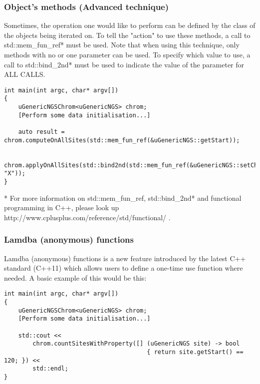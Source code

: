 \documentclass[letterpaper,10pt]{article}
\begin{document}
\subsubsection{Object's methods (Advanced technique)}
Sometimes, the operation one would like to perform can be defined by the class of the objects being iterated on. To tell the "action" to use these methods, a call to std::mem\_fun\_ref* must be used. Note that when using this technique, only methods with no or one parameter can be used. To specify which value to use, a call to std::bind\_2nd* must be used to indicate the value of the parameter for ALL CALLS.
\begin{verbatim}
int main(int argc, char* argv[])
{
    uGenericNGSChrom<uGenericNGS> chrom;
    [Perform some data initialisation...]

    auto result = chrom.computeOnAllSites(std::mem_fun_ref(&uGenericNGS::getStart));

    chrom.applyOnAllSites(std::bind2nd(std::mem_fun_ref(&uGenericNGS::setChr), "X"));
}
\end{verbatim}

* For more information on std::mem\_fun\_ref, std::bind\_2nd* and functional programming in C++, please look up http://www.cplusplus.com/reference/std/functional/ .

\subsubsection{Lamdba (anonymous) functions}
Lamdba (anonymous) functions is a new feature introduced by the latest C++ standard (C++11) which allows users to define a one-time use function where needed. A basic example of this would be this:
\begin{verbatim}
int main(int argc, char* argv[])
{
    uGenericNGSChrom<uGenericNGS> chrom;
    [Perform some data initialisation...]

    std::cout << 
        chrom.countSitesWithProperty([] (uGenericNGS site) -> bool 
                                        { return site.getStart() == 120; }) << 
        std::endl;
}
\end{verbatim}
\end{document}
